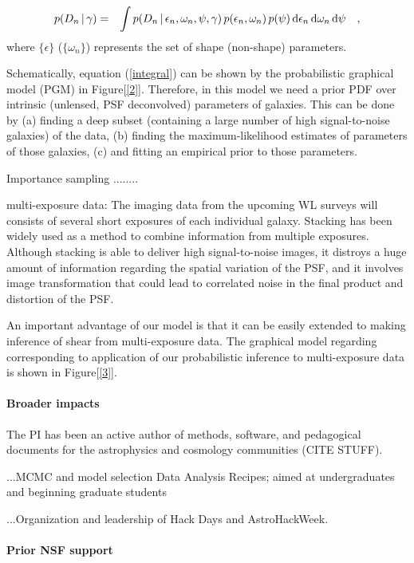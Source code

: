 \documentclass[12pt]{article}
\newcommand{\dd}{\mathrm{d}}
\newcommand{\data}{D}
\newcommand{\intrinsic}{\epsilon}
\newcommand{\shear}{\gamma}
\newcommand{\psf}{\psi}
\begin{document}
\begin{eqnarray}
p(\data_n\given\shear)
  &=& \int p(\data_n\given\intrinsic_n , \omega_{n}, \psf , \shear)
  \,p(\intrinsic_n, \omega_{n})\,p(\psf)\,\dd\intrinsic_n\,\dd\omega_n\,\dd\psf
  \quad ,
\label{integral}
\end{eqnarray}
where $\{\intrinsic\}$ ($\{\omega_{n}\}$) represents the set of shape
(non-shape) parameters.

Schematically, equation (\ref{integral}) can be shown by the probabilistic
graphical model (PGM) in Figure[\ref{2}]. Therefore, in this model we need
a prior PDF over intrinsic (unlensed, PSF deconvolved) parameters of galaxies.
This can be done by (a) finding a deep subset (containing a large number of high
signal-to-noise galaxies) of the data, (b) finding the maximum-likelihood estimates
of parameters of those galaxies, (c) and fitting an empirical prior to those parameters. 

Importance sampling ........

multi-exposure data:
The imaging data from the upcoming WL surveys will consists of several
short exposures of each individual galaxy. Stacking has been widely used
as a method to combine information from multiple exposures. 
Although stacking is able to deliver high signal-to-noise images, it distroys a
huge amount of information regarding the spatial variation of
the PSF, and it involves image transformation that could lead to correlated noise
in the final product and distortion of the PSF.

An important advantage of our model is that it can be easily extended
to making inference of shear from multi-exposure data. The graphical model 
regarding corresponding to application of our probabilistic inference to
multi-exposure data is shown in Figure[\ref{3}].

\paragraph{Broader impacts}

The PI has been an active author of methods, software, and pedagogical
documents for the astrophysics and cosmology communities (CITE STUFF).

...MCMC and model selection Data Analysis Recipes; aimed at undergraduates and beginning graduate students

...Organization and leadership of Hack Days and AstroHackWeek.

\paragraph{Prior NSF support}
\end{document}
